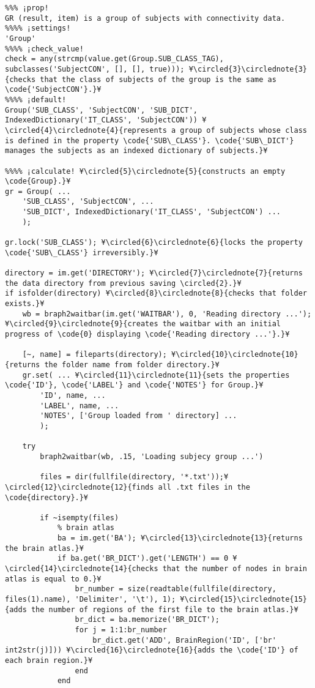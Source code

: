 \documentclass{tufte-handout}
\begin{document}
\begin{lstlisting}
%%% ¡prop!
GR (result, item) is a group of subjects with connectivity data.
%%%% ¡settings!
'Group'
%%%% ¡check_value!
check = any(strcmp(value.get(Group.SUB_CLASS_TAG), subclasses('SubjectCON', [], [], true))); ¥\circled{3}\circlednote{3}{checks that the class of subjects of the group is the same as \code{'SubjectCON'}.}¥
%%%% ¡default!
Group('SUB_CLASS', 'SubjectCON', 'SUB_DICT', IndexedDictionary('IT_CLASS', 'SubjectCON')) ¥\circled{4}\circlednote{4}{represents a group of subjects whose class is defined in the property \code{'SUB\_CLASS'}. \code{'SUB\_DICT'} manages the subjects as an indexed dictionary of subjects.}¥

%%%% ¡calculate! ¥\circled{5}\circlednote{5}{constructs an empty \code{Group}.}¥
gr = Group( ...
    'SUB_CLASS', 'SubjectCON', ...
    'SUB_DICT', IndexedDictionary('IT_CLASS', 'SubjectCON') ...
    );

gr.lock('SUB_CLASS'); ¥\circled{6}\circlednote{6}{locks the property \code{'SUB\_CLASS'} irreversibly.}¥

directory = im.get('DIRECTORY'); ¥\circled{7}\circlednote{7}{returns the data directory from previous saving \circled{2}.}¥
if isfolder(directory) ¥\circled{8}\circlednote{8}{checks that folder exists.}¥
    wb = braph2waitbar(im.get('WAITBAR'), 0, 'Reading directory ...'); ¥\circled{9}\circlednote{9}{creates the waitbar with an initial progress of \code{0} displaying \code{'Reading directory ...'}.}¥
    
    [~, name] = fileparts(directory); ¥\circled{10}\circlednote{10}{returns the folder name from folder directory.}¥
    gr.set( ... ¥\circled{11}\circlednote{11}{sets the properties \code{'ID'}, \code{'LABEL'} and \code{'NOTES'} for Group.}¥
        'ID', name, ...
        'LABEL', name, ...
        'NOTES', ['Group loaded from ' directory] ...
        );

    try
        braph2waitbar(wb, .15, 'Loading subjecy group ...')

        files = dir(fullfile(directory, '*.txt'));¥\circled{12}\circlednote{12}{finds all .txt files in the \code{directory}.}¥

        if ~isempty(files) 
            % brain atlas
            ba = im.get('BA'); ¥\circled{13}\circlednote{13}{returns the brain atlas.}¥
            if ba.get('BR_DICT').get('LENGTH') == 0 ¥\circled{14}\circlednote{14}{checks that the number of nodes in brain atlas is equal to 0.}¥
                br_number = size(readtable(fullfile(directory, files(1).name), 'Delimiter', '\t'), 1); ¥\circled{15}\circlednote{15}{adds the number of regions of the first file to the brain atlas.}¥
                br_dict = ba.memorize('BR_DICT');
                for j = 1:1:br_number
                    br_dict.get('ADD', BrainRegion('ID', ['br' int2str(j)])) ¥\circled{16}\circlednote{16}{adds the \code{'ID'} of each brain region.}¥
                end
            end


\end{lstlisting}
\end{document}
